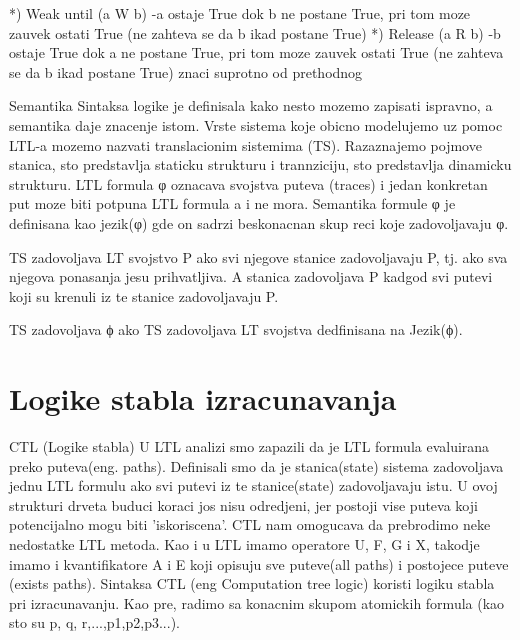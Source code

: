 \documentclass[a4paper]{article}
\begin{document}
{*) Weak until (a W b) \newline
	-a ostaje True dok b ne postane True, pri tom moze zauvek ostati True (ne zahteva se da b ikad postane True) \newline
*) Release (a R b) \newline
	-b ostaje True dok a ne postane True, pri tom moze zauvek ostati True (ne zahteva se da b ikad postane True) znaci suprotno od prethodnog \newline

Semantika
\newline
\newline
Sintaksa logike je definisala kako nesto mozemo zapisati ispravno, a semantika daje znacenje istom.
Vrste sistema koje obicno modelujemo uz pomoc LTL-a mozemo nazvati translacionim sistemima (TS). Razaznajemo pojmove stanica, sto predstavlja staticku strukturu i trannziciju, sto predstavlja dinamicku strukturu.
LTL formula φ oznacava svojstva puteva (traces) i jedan konkretan put moze biti potpuna LTL formula a i ne mora.
Semantika formule φ je definisana kao jezik(φ) gde on sadrzi beskonacnan skup reci koje zadovoljavaju φ.

TS zadovoljava LT svojstvo P ako svi njegove stanice zadovoljavaju P, tj. ako sva njegova ponasanja jesu prihvatljiva. A stanica zadovoljava P kadgod svi putevi koji su krenuli iz te stanice zadovoljavaju P.

TS zadovoljava ϕ ako TS zadovoljava LT svojstva dedfinisana na Jezik(ϕ).
}

\section{Logike stabla izracunavanja}
\label{sec:CTL}

CTL (Logike stabla)
\newline
\newline
U LTL analizi smo zapazili da je LTL formula evaluirana preko puteva(eng. paths). Definisali smo da je stanica(state) sistema
zadovoljava jednu LTL formulu ako svi putevi iz te stanice(state) zadovoljavaju istu. U ovoj strukturi drveta buduci koraci jos nisu
odredjeni, jer postoji vise puteva koji potencijalno mogu biti 'iskoriscena'.
CTL nam omogucava da prebrodimo neke nedostatke LTL metoda. Kao i u LTL imamo operatore U, F, G i X, takodje imamo i kvantifikatore
A i E koji opisuju sve puteve(all paths) i postojece puteve (exists paths). 
\newline
\newline
Sintaksa
\newline
\newline
CTL (eng Computation tree logic) koristi logiku stabla pri izracunavanju. 
Kao pre, radimo sa konacnim skupom atomickih formula (kao sto su p, q, r,...,p1,p2,p3...).
\end{document}
